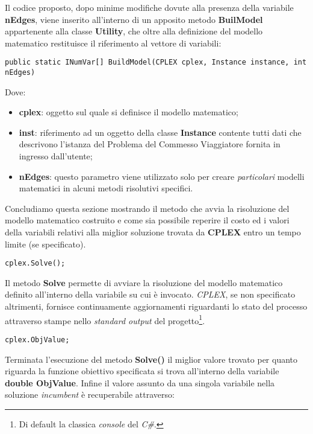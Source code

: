 \documentclass[11pt]{article}
\begin{document}
Il codice proposto, dopo minime modifiche dovute alla presenza della variabile \textbf{nEdges}, viene inserito all'interno di un apposito metodo \textbf{BuilModel} appartenente alla classe \textbf{Utility}, che oltre alla definizione del modello matematico restituisce il riferimento al vettore di variabili:

\begin{lstlisting}
public static INumVar[] BuildModel(CPLEX cplex, Instance instance, int nEdges)
\end{lstlisting}

Dove:

\begin{itemize}
\item \textbf{cplex}: oggetto sul quale si definisce il modello matematico;
\item \textbf{inst}: riferimento ad un oggetto della classe \textbf{Instance} contente tutti dati che descrivono l'istanza del Problema del Commesso Viaggiatore fornita in ingresso dall'utente;
\item \textbf{nEdges}: questo parametro viene utilizzato solo per creare \textit{particolari} modelli matematici in alcuni metodi risolutivi specifici.
\end{itemize}

Concludiamo questa sezione mostrando il metodo che avvia la risoluzione del modello matematico costruito e come sia possibile reperire il costo ed i valori della variabili relativi alla miglior soluzione trovata da \textbf{CPLEX} entro un tempo limite (se specificato).

\begin{lstlisting}
cplex.Solve();
\end{lstlisting}

Il metodo \textbf{Solve} permette di avviare la risoluzione del modello matematico definito all'interno della variabile su cui è invocato. \textit{CPLEX}, se non specificato altrimenti, fornisce continuamente aggiornamenti riguardanti lo stato del processo attraverso stampe nello \textit{standard output} del progetto\footnote{Di default la classica \textit{console} del \textit{C\#}.}.

\begin{lstlisting}
cplex.ObjValue;
\end{lstlisting}

Terminata l'esecuzione del metodo \textbf{Solve()} il miglior valore trovato per quanto riguarda la funzione obiettivo specificata si trova all'interno della variabile \textbf{double ObjValue}. Infine il valore assunto da una singola variabile nella soluzione \textit{incumbent} è recuperabile attraverso:
\end{document}
